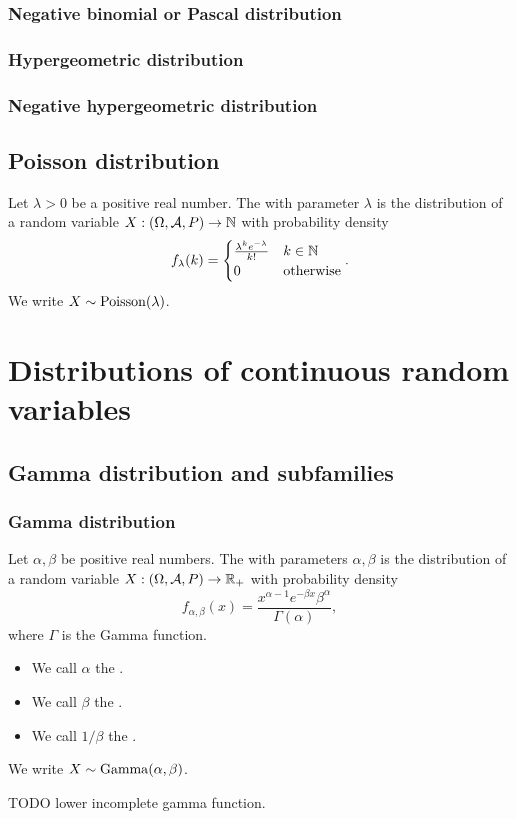 \subsubsection{Negative binomial or Pascal distribution}
\subsubsection{Hypergeometric distribution}
\subsubsection{Negative hypergeometric distribution}

\subsection{Poisson distribution}
\begin{definition}
Let $\lambda > 0$ be a positive real number. The  with parameter $\lambda$ is the distribution of a random variable $X: \left( \Omega, \mathcal{A}, P \right) \to \mathbb{N}$ with probability density
\[ f_\lambda(k) = \begin{cases}
\frac{\lambda^k e^{-\lambda}}{k!} & k\in\mathbb{N} \\
0 & \text{otherwise}
\end{cases}. \]
We write $X \sim \operatorname{Poisson}(\lambda)$.
\end{definition}

\section{Distributions of continuous random variables}
\subsection{Gamma distribution and subfamilies}
\subsubsection{Gamma distribution}
\begin{definition}
Let $\alpha, \beta$ be positive real numbers. The  with parameters $\alpha, \beta$ is the distribution of a random variable $X: \left( \Omega, \mathcal{A}, P \right) \to \mathbb{R}_+$ with probability density
\[ f_{\alpha,\beta}(x) = \frac{x^{\alpha-1}e^{-\beta x}\beta^\alpha}{\Gamma(\alpha)}, \]
where $\Gamma$ is the Gamma function.
\begin{itemize}
\item We call $\alpha$ the .
\item We call $\beta$ the .
\item We call $1/\beta$ the .
\end{itemize}
We write $X \sim \operatorname{Gamma}(\alpha,\beta)$.
\end{definition}
TODO lower incomplete gamma function.

